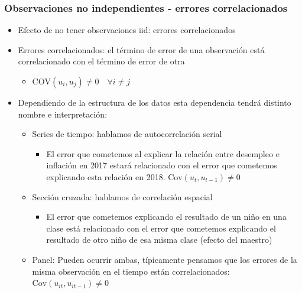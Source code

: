 \documentclass{beamer}
\begin{document}
\begin{frame}[shrink=10]
\frametitle{Observaciones no independientes - errores correlacionados}

\begin{itemize}
  \item Efecto de no tener observaciones iid: errores correlacionados
  \item Errores correlacionados: el término de error de una observación está correlacionado con el término de error de otra
  \begin{itemize}
    \item \( \text{COV}(u_i, u_j) \neq 0 \quad \forall i \neq j \)
  \end{itemize}
  \item Dependiendo de la estructura de los datos esta dependencia tendrá distinto nombre e interpretación:
  \begin{itemize}
    \item Series de tiempo: hablamos de autocorrelación serial
    \begin{itemize}
      \item El error que cometemos al explicar la relación entre desempleo e inflación en 2017 estará relacionado con el error que cometemos explicando esta relación en 2018. \( \text{Cov}(u_t, u_{t-1}) \neq 0 \)
    \end{itemize}
    \item Sección cruzada: hablamos de correlación espacial
    \begin{itemize}
      \item El error que cometemos explicando el resultado de un niño en una clase está relacionado con el error que cometemos explicando el resultado de otro niño de esa misma clase (efecto del maestro)
    \end{itemize}
    \item Panel: Pueden ocurrir ambas, típicamente pensamos que los errores de la misma observación en el tiempo están correlacionados: \( \text{Cov}(u_{it}, u_{it-1}) \neq 0 \)
    \end{itemize}
  \end{itemize}

\end{frame}
\end{document}
